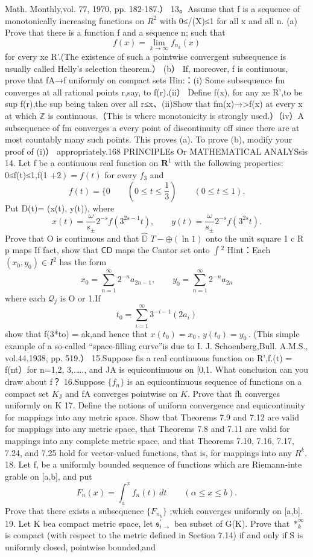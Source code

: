 Math. Monthly,vol. 77, 1970, pp. 182-187.） 13。Assume that {f} is a sequence of monotonically increasing functions on $\textstyle{R^{2}}$ with 0≤/(X)≤1 for all x and all n. (a) Prove that there is a function f and a sequence {n;} such that $$ f(x)=\operatorname*{lim}_{k\to\infty}f_{n_{k}}(x) $$ for cvery xe R'.(The existence of such a pointwise convergent subsequence is usually called Helly's selection theorem.） (b） If, moreover, f is continuous, prove that fA→f uniformly on compact sets Hin:：(i) Some subsequence {fm} converges at all rational points r,say, to f(r).(ii） Define f(x), for any xe R',to be sup f(r),the sup being taken over all r≤x、(ii)Show that fm(x)→>f(x) at every x at which $\mathbb{Z}$ is continuous.（This is wherc monotonicity is strongly used.）（iv）A subsequence of {fm} converges a every point of discontinuity off since there are at most countably many such points. This proves (a). To prove (b), modify your proof of (i)） appropriately.168 PRINCIPLEs Or MATHEMATICAL ANALYSsis 14. Let f be a continuous real function on ${\boldsymbol{R}}^{1}$ with the following properties: 0≤f(t)≤1,f(1 $\left.+2\right)=f(t)$ for every ${\hat{f}}_{3}$ and $$ f(t)= \{0\qquad(0\leq t\leq\frac{1}{3})\qquad(0\leq t\leq1). $$ Put D(t)= (x(t), y(t)), where $$ x(t)={\frac{\omega}{s_{\pm}}}2^{-s}f(3^{2s-1}t),\qquad y(t)={\frac{\omega}{s_{\pm}}}2^{-s}f(3^{2s}t). $$ Prove that O is continuous and that ${\widehat{\mathbb{D}}}$ $\scriptstyle T\scriptstyle-\oplus(\ln1)$ onto the unit square 1 c R p maps If fact, show that ${\mathsf{C}}{\mathsf{D}}$ maps the Cantor set onto $\textstyle\int\!^{2}$ Hint：Each $(x_{0},y_{0})\in I^{2}$ has the form $$ x_{0}=\sum_{n=1}^{\infty}2^{-n}a_{2n-1},\qquad y_{0}=\sum_{n=1}^{\infty}2^{-n}a_{2n} $$ where each ${\mathcal{Q}}_{j}$ is O or 1.If $$ t_{0}=\sum_{i=1}^{\infty}3^{-i-1}(2a_{i}) $$ show that f(3*to) = ak,and hence that $x(t_{0})=x_{0}\,,\,y(t_{0})=y_{0}\,.$ (This simple example of a so-called “space-filling curve”is due to I. J. Schoenberg,Bull. A.M.S., vol.44,1938, pp. 519.） 15.Suppose fis a real continuous function on R',f.(t) = f(nt）for n=1,2, 3,.…., and {JA} is equicontinuous on [0,1. What conclusion can you draw about f？ 16.Suppose $\{f_{n}\}$ is an equicontinuous sequence of functions on a compact set $K_{\mathrm{{J}}}$ and {fA} converges pointwise on $K.$ Prove that {fh} converges uniformly on K 17. Define the notions of uniform convergence and equicontinuity for mappings into any metric space. Show that Theorems 7.9 and 7.12 are valid for mappings into any metric space, that Theorems 7.8 and 7.11 are valid for mappings into any complete metric space, and that Theorems 7.10, 7.16, 7.17, 7.24, and 7.25 hold for vector-valued functions, that is, for mappings into any $R^{k}.$ 18. Let {f,} be a uniformly bounded sequence of functions which are Riemann-inte grable on [a,b], and put $$ F_{n}(x)=\int_{a}^{x}\!f_{n}(t)\,d t\qquad(\alpha\leq x\leq b). $$ Prove that there exists a subsequence { $\{F_{n_{k}}\}$ ;}which converges uniformly on [a,b]. 19. Let K bea compact metric space, let ${\mathfrak{s}}_{i\to}^{\prime}$ bea subset of G(K). Prove that $*_{k}^{\infty}$ is compact (with respect to the metric defined in Section 7.14) if and only if S is uniformly closed, pointwise bounded,and 